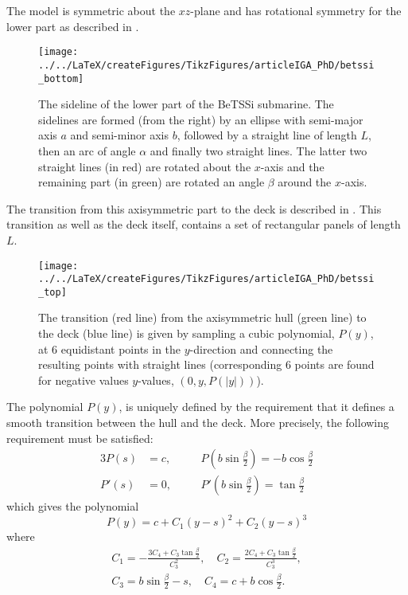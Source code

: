 The model is symmetric about the $xz$-plane and has rotational symmetry for the lower part as described in .
\begin{figure}
	\centering
	\texttt{[image: ../../LaTeX/createFigures/TikzFigures/articleIGA\_PhD/betssi\_bottom]}
	\caption{The sideline of the lower part of the BeTSSi submarine. The sidelines are formed (from the right) by an ellipse with semi-major axis $a$ and semi-minor axis $b$, followed by a straight line of length $L$, then an arc of angle $\alpha$ and finally two straight lines. The latter two straight lines (in red) are rotated about the $x$-axis and the remaining part (in green) are rotated an angle $\beta$ around the $x$-axis.}
	\label{Fig2:bettsi_bottom}
\end{figure}
The transition from this axisymmetric part to the deck is described in . This transition as well as the deck itself, contains a set of rectangular panels of length $L$.
\begin{figure}
	\centering
	\texttt{[image: ../../LaTeX/createFigures/TikzFigures/articleIGA\_PhD/betssi\_top]}
	\caption{The transition (red line) from the axisymmetric hull (green line) to the deck (blue line) is given by sampling a cubic polynomial, $P(y)$, at 6 equidistant points in the $y$-direction and connecting the resulting points with straight lines (corresponding 6 points are found for negative values $y$-values, $(0,y,P(|y|))$).}
	\label{Fig2:bettsi_top}
\end{figure}
The polynomial $P(y)$, is uniquely defined by the requirement that it defines a smooth transition between the hull and the deck. More precisely, the following requirement must be satisfied: 
\begin{alignat*}{3}
	P(s) &= c,\quad  &&P\left(b\sin\frac{\beta}{2}\right) = -b\cos\frac{\beta}{2}\\
	P'(s) &= 0,\quad &&P'\left(b\sin\frac{\beta}{2}\right) = \tan\frac{\beta}{2}
\end{alignat*}
which gives the polynomial
\begin{equation}
	P(y) = c+C_1(y-s)^2+C_2(y-s)^3
\end{equation}
where
\begin{align*}
	C_1 = -\frac{3C_4+C_3\tan\frac{\beta}{2}}{C_3^2}, \quad
	C_2 = \frac{2C_4+C_3\tan\frac{\beta}{2}}{C_3^3},\\
	C_3 = b\sin\frac{\beta}{2}-s, \quad
	C_4 = c+b\cos\frac{\beta}{2}.
\end{align*}
